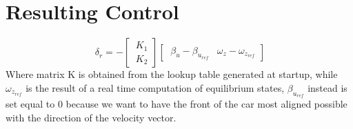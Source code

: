 \section{Resulting Control}
\begin{equation} \label{Resulting Control}
	\ \delta_{r} = -
	\begin{bmatrix}
	\ K_{1}\\
	\ K_{2}
	\end{bmatrix}
	\begin{bmatrix}
	\ \beta_{u}-\beta_{u_{ref}} & \omega_{z}-\omega_{z_{ref}}
	\end{bmatrix}
\end{equation}
Where matrix K is obtained from the lookup table generated at startup, while $\omega_{z_{ref}}$ is the result of a real time computation of equilibrium states, $\beta_{u_{ref}}$ instead is set equal to 0 because we want to have the front of the car most aligned possible with the direction of the velocity vector.
